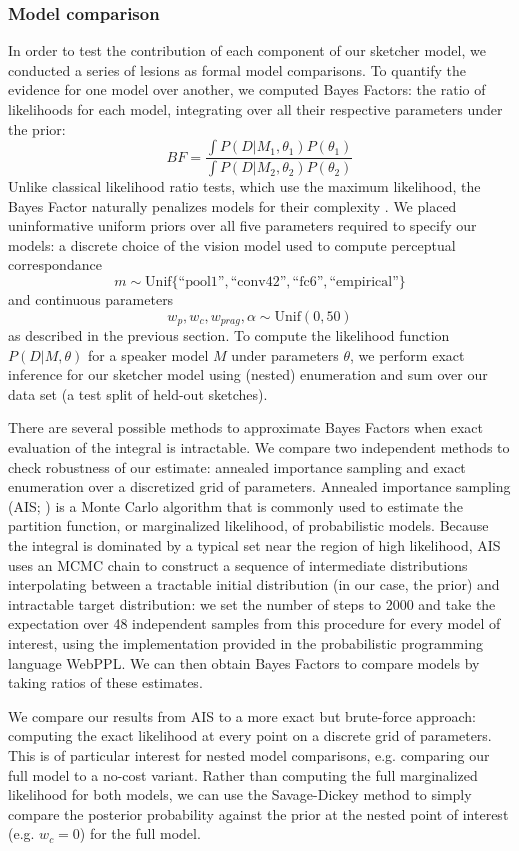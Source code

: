 \documentclass[9pt,twocolumn,twoside]{pnas-new}
\begin{document}
{\subsubsection*{Model comparison}

In order to test the contribution of each component of our sketcher model, we conducted a series of lesions as formal model comparisons.
To quantify the evidence for one model over another, we computed Bayes Factors:
the ratio of likelihoods for each model, integrating over all their respective parameters under the prior:
$$BF = \frac{\int P(D | M_1, \theta_1)P(\theta_1)}{\int P(D | M_2, \theta_2)P(\theta_2)}$$
Unlike classical likelihood ratio tests, which use the maximum likelihood, the Bayes Factor naturally penalizes models for their complexity \cite{rouder}.
We placed uninformative uniform priors over all five parameters required to specify our models: a discrete choice of the vision model used to compute perceptual correspondance
$$m \sim \textrm{Unif}\{\textrm{``pool1''}, \textrm{``conv42''}, \textrm{``fc6''}, \textrm{``empirical''}\}$$
and continuous parameters
$$w_p, w_c, w_{prag}, \alpha \sim \textrm{Unif}(0, 50)$$
as described in the previous section. To compute the likelihood function $P(D | M, \theta)$ for a speaker model $M$ under parameters $\theta$, we perform exact inference for our sketcher model using (nested) enumeration and sum over our data set (a test split of held-out sketches).

There are several possible methods to approximate Bayes Factors when exact evaluation of the integral is intractable. We compare two independent methods to check robustness of our estimate: annealed importance sampling and exact enumeration over a discretized grid of parameters. Annealed importance sampling (AIS; \cite{neal2001}) is a Monte Carlo algorithm that is commonly used to estimate the partition function, or marginalized likelihood, of probabilistic models. Because the integral is dominated by a typical set near the region of high likelihood, AIS uses an MCMC chain to construct a sequence of intermediate distributions interpolating between a tractable initial distribution (in our case, the prior) and intractable target distribution: we set the number of steps to 2000 and take the expectation over 48 independent samples from this procedure for every model of interest, using the implementation provided in the probabilistic programming language WebPPL. We can then obtain Bayes Factors to compare models by taking ratios of these estimates.

We compare our results from AIS to a more exact but brute-force approach: computing the exact likelihood at every point on a discrete grid of parameters.
This is of particular interest for nested model comparisons, e.g. comparing our full model to a no-cost variant.
Rather than computing the full marginalized likelihood for both models, we can use the Savage-Dickey method \cite{WagenmakersEtAl10} to simply compare the posterior probability against the prior at the nested point of interest (e.g. $w_c = 0$) for the full model.

}
\end{document}
